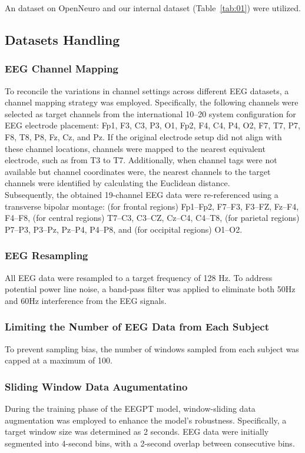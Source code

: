 An dataset on OpenNeuro \cite{ds003555:1.0.0} and our internal dataset (Table~\ref{tab:01}) were utilized.


\subsection{Datasets Handling}
\subsubsection{EEG Channel Mapping}
To reconcile the variations in channel settings across different EEG datasets, a channel mapping strategy was employed. Specifically, the following channels were selected as target channels from the international 10--20 system configuration for EEG electrode placement: Fp1, F3, C3, P3, O1, Fp2, F4, C4, P4, O2, F7, T7, P7, F8, T8, P8, Fz, Cz, and Pz. If the original electrode setup did not align with these channel locations, channels were mapped to the nearest equivalent electrode, such as from T3 to T7. Additionally, when channel tags were not available but channel coordinates were, the nearest channels to the target channels were identified by calculating the Euclidean distance.
\\
\indent
Subsequently, the obtained 19-channel EEG data were re-referenced using a transverse bipolar montage: (for frontal regions) Fp1--Fp2, F7--F3, F3--FZ, Fz--F4, F4--F8, (for central regions) T7--C3, C3--CZ, Cz--C4, C4--T8, (for parietal regions) P7--P3, P3--Pz, Pz--P4, P4--P8, and (for occipital regions) O1--O2.

\subsubsection{EEG Resampling}
All EEG data were resampled to a target frequency of 128 Hz. To address potential power line noise, a band-pass filter was applied to eliminate both 50Hz and 60Hz interference from the EEG signals.

\subsubsection{Limiting the Number of EEG Data from Each Subject}
To prevent sampling bias, the number of windows sampled from each subject was capped at a maximum of 100.

\subsubsection{Sliding Window Data Augumentatino}
During the training phase of the EEGPT model, window-sliding data augmentation was employed to enhance the model's robustness. Specifically, a target window size was determined as 2 seconds. EEG data were initially segmented into 4-second bins, with a 2-second overlap between consecutive bins.

